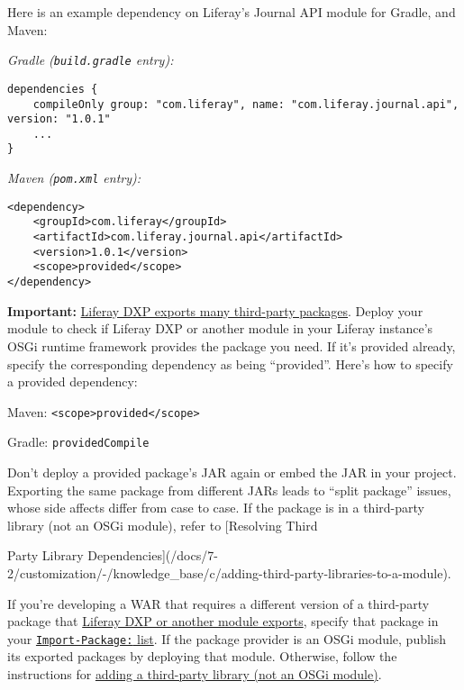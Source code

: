 \noindent\hrulefill

Here is an example dependency on Liferay's Journal API module for
Gradle, and Maven:

\emph{Gradle (\texttt{build.gradle} entry):}

\begin{verbatim}
dependencies {
    compileOnly group: "com.liferay", name: "com.liferay.journal.api", version: "1.0.1"
    ...
}
\end{verbatim}

\emph{Maven (\texttt{pom.xml} entry):}

\begin{verbatim}
<dependency>
    <groupId>com.liferay</groupId>
    <artifactId>com.liferay.journal.api</artifactId>
    <version>1.0.1</version>
    <scope>provided</scope>
</dependency>
\end{verbatim}

\noindent\hrulefill

\textbf{Important:}
\href{/docs/7-2/reference/-/knowledge_base/r/third-party-packages-portal-exports}{Liferay
DXP exports many third-party packages}. Deploy your module to check if
Liferay DXP or another module in your Liferay instance's OSGi runtime
framework provides the package you need. If it's provided already,
specify the corresponding dependency as being ``provided''. Here's how
to specify a provided dependency:

Maven:
\texttt{\textless{}scope\textgreater{}provided\textless{}/scope\textgreater{}}

Gradle: \texttt{providedCompile}

Don't deploy a provided package's JAR again or embed the JAR in your
project. Exporting the same package from different JARs leads to ``split
package'' issues, whose side affects differ from case to case. If the
package is in a third-party library (not an OSGi module), refer to
{[}Resolving Third

\noindent\hrulefill Party Library
Dependencies{]}(/docs/7-2/customization/-/knowledge\_base/c/adding-third-party-libraries-to-a-module).

\noindent\hrulefill

If you're developing a WAR that requires a different version of a
third-party package that
\href{/docs/7-2/reference/-/knowledge_base/r/third-party-packages-portal-exports}{Liferay
DXP or another module exports}, specify that package in your
\href{/docs/7-2/customization/-/knowledge_base/c/importing-packages}{\texttt{Import-Package:}
list}. If the package provider is an OSGi module, publish its exported
packages by deploying that module. Otherwise, follow the instructions
for
\href{/docs/7-2/customization/-/knowledge_base/c/adding-third-party-libraries-to-a-module}{adding
a third-party library (not an OSGi module)}.

